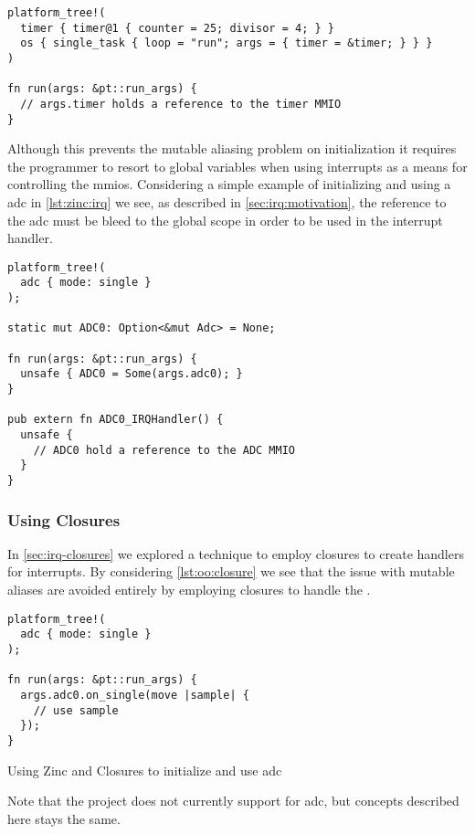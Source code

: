 \begin{listing}[H]
  \begin{verbatim}
platform_tree!(
  timer { timer@1 { counter = 25; divisor = 4; } }
  os { single_task { loop = "run"; args = { timer = &timer; } } }
)

fn run(args: &pt::run_args) {
  // args.timer holds a reference to the timer MMIO
}
  \end{verbatim}
  \caption{}
  \label{lst:zinc:platformtree}
\end{listing}

Although this prevents the mutable aliasing problem on initialization it requires the programmer to resort to global variables when using interrupts as a means for controlling the \glspl{mmio}.
Considering a simple example of initializing and using a \gls{adc} in \autoref{lst:zinc:irq} we see, as described in \autoref{sec:irq:motivation}, the reference to the \gls{adc} must be bleed to the global scope in order to be used in the interrupt handler.

\begin{listing}[H]
  \begin{verbatim}
platform_tree!(
  adc { mode: single }
);

static mut ADC0: Option<&mut Adc> = None;

fn run(args: &pt::run_args) {
  unsafe { ADC0 = Some(args.adc0); }
}

pub extern fn ADC0_IRQHandler() {
  unsafe {
    // ADC0 hold a reference to the ADC MMIO
  }
}
  \end{verbatim}
  \caption{}
  \label{lst:zinc:irq}
\end{listing}

\subsubsection{Using Closures}

In \autoref{sec:irq-closures} we explored a technique to employ closures to create handlers for interrupts.
By considering \autoref{lst:oo:closure} we see that the issue with mutable aliases are avoided entirely by employing closures to handle the .

\begin{listing}[H]
  \begin{verbatim}
platform_tree!(
  adc { mode: single }
);

fn run(args: &pt::run_args) {
  args.adc0.on_single(move |sample| {
    // use sample
  });
}
  \end{verbatim}
  \caption{Using Zinc and Closures to initialize and use \gls{adc}}
  \label{lst:oo:closure}
\end{listing}

Note that the  project does not currently support for \gls{adc}, but concepts described here stays the same.
